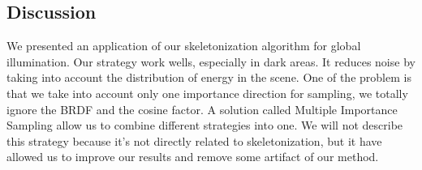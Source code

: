 \subsection{Discussion}

We presented an application of our skeletonization algorithm for global illumination. Our strategy work wells, especially in dark areas. It reduces noise by taking into account the distribution of energy in the scene. One of the problem is that we take into account only one importance direction for sampling, we totally ignore the BRDF and the cosine factor. A solution called Multiple Importance Sampling allow us to combine different strategies into one. We will not describe this strategy because it's not directly related to skeletonization, but it have allowed us to improve our results and remove some artifact of our method.

